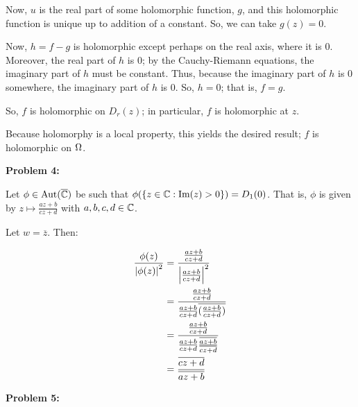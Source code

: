 \documentclass[a4paper,12pt]{article}
\begin{document}
Now, $u$ is the real part of some holomorphic function, $g$, and this holomorphic function is unique up to addition of a constant. So, we can take $g(z) = 0$. %

Now, $h=f-g$ is holomorphic except perhaps on the real axis, where it is $0$. Moreover, the real part of $h$ is $0$; by the Cauchy-Riemann equations, the imaginary part of $h$ must be constant. Thus, because the imaginary part of $h$ is $0$ somewhere, the imaginary part of $h$ is $0$. So, $h=0$; that is, $f=g$.%

So, $f$ is holomorphic on $D_r(z)$; in particular, $f$ is holomorphic at $z$.

Because holomorphy is a local property, this yields the desired result; $f$ is holomorphic on $\Omega$. 

\shunt

{\bf Problem 4:}

Let $\phi \in \text{Aut}(\overline{\mathbb{C}})$ be such that $\phi(\{z\in \mathbb{C}:\text{Im}(z)>0\}) = D_1(0)$. That is, $\phi$ is given by $z \mapsto \frac{az+b}{cz+d}$ with $a,b,c,d \in \mathbb{C}$. %

Let $w = \overline{z}$. Then:

\begin{align*}
\frac{\phi(z)}{\left\lvert \phi(z) \right\rvert^2} &= \frac{\frac{az+b}{cz+d}}{\left\lvert \frac{az+b}{cz+d} \right\rvert^2}\\
&= \frac{\frac{az+b}{cz+d}}{\frac{az+b}{cz+d}\overline{(\frac{az+b}{cz+d})}}\\
&= \frac{\frac{az+b}{cz+d}}{\frac{az+b}{cz+d}\frac{\overline{az+b}}{\overline{cz+d}}}\\
&= \frac{\overline{cz+d}}{\overline{az+b}}\\
\end{align*}

\shunt

{\bf Problem 5:}

\shunt
\end{document}
